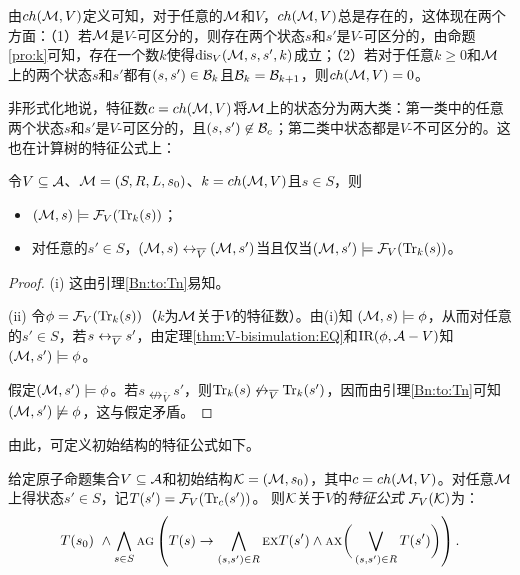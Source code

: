 由$ch({\cal M},V)$定义可知，对于任意的${\cal M}$和$V$，$ch({\cal M},V)$总是存在的，这体现在两个方面：（1）若${\cal M}$是$V$-可区分的，则存在两个状态$s$和$s'$是$V$-可区分的，由命题\ref{pro:k}可知，存在一个数$k$使得$\textrm{dis}_V({\cal M},s,s',k)$成立；（2）若对于任意$k\geq 0$和${\cal M}$上的两个状态$s$和$s'$都有$(s,s')\in {\cal B}_k$且${\cal B}_k ={\cal B}_{k+1}$，则$ch({\cal M},V)=0$。

非形式化地说，特征数$c=ch({\cal M},V)$将${\cal M}$上的状态分为两大类：第一类中的任意两个状态$s$和$s'$是$V$-可区分的，且$(s,s')\not \in {\cal B}_c$；第二类中状态都是$V$-不可区分的。这也在计算树的特征公式上：

\begin{lemma}\label{div_s}
	令$V\subseteq {\cal A}$、${\cal M}=(S,R,L,s_0)$、$k={ch({\cal M},V)}$且$s\in S$，则
	\begin{itemize}
		\item[(i)] $({\cal M}, s)\models {\cal F}_V(\textrm{Tr}_k(s))$；
		\item[(ii)] 对任意的$s'\in S$，$({\cal M},s) \leftrightarrow_{\overline V} ({\cal M},s')$当且仅当$({\cal M},s')\models{\cal F}_V(\textrm{Tr}_k(s))$。
	\end{itemize}
\end{lemma}
\begin{proof}
	(i) 这由引理\ref{Bn:to:Tn}易知。
	
	(ii) 令$\phi = {\cal F}_V(\textrm{Tr}_k(s))$（$k$为${\cal M}$关于$V$的特征数）。由(i)知 $({\cal M}, s) \models \phi$，从而对任意的$s' \in S$，若$s \leftrightarrow_{\overline V} s'$，由定理\ref{thm:V-bisimulation:EQ}和$\textrm{IR}(\phi, {\cal A} - V)$知$({\cal M}, s') \models \phi$。
	
	假定$({\cal M}, s')\models \phi$。若$s \nleftrightarrow_{\overline V} s'$，则$\textrm{Tr}_k(s) \not \leftrightarrow_{\overline V} \textrm{Tr}_k(s')$，因而由引理\ref{Bn:to:Tn}可知$({\cal M}, s')\not \models \phi$，这与假定矛盾。
\end{proof}

由此，可定义初始结构的特征公式如下。

\begin{definition}[特征公式]
	给定原子命题集合$V\subseteq\cal A$和初始结构${\cal K}=({\cal M},s_0)$，其中$c=ch({\cal M},V)$。对任意${\cal M}$上得状态$s' \in S$，记$T(s') = {\cal F}_V(\textrm{Tr}_c(s'))$。
	则$\cal K$关于$V$的{\em 特征公式} ${\cal F}_V({\cal K})$为：
	\[T(s_0) \text{ } \wedge \bigwedge_{s\in S}\textsc{a} \textsc{g}\left(
	T(s) \rightarrow
	\bigwedge_{(s,s')\in R}
	\textsc{e} \textsc{x} T(s')
	\wedge
	\textsc{a} \textsc{x} \bigg(\bigvee_{(s,s')\in R}T(s')\bigg)
	\right).
	\]
	
\end{definition}

